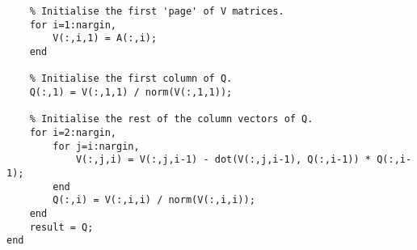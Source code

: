 \documentclass{article}
\begin{document}
\begin{enumerate}
\begin{enumerate}
\begin{verbatim}
    % Initialise the first 'page' of V matrices.
    for i=1:nargin,
        V(:,i,1) = A(:,i);
    end
    
    % Initialise the first column of Q.
    Q(:,1) = V(:,1,1) / norm(V(:,1,1));
    
    % Initialise the rest of the column vectors of Q.
    for i=2:nargin,
        for j=i:nargin,
            V(:,j,i) = V(:,j,i-1) - dot(V(:,j,i-1), Q(:,i-1)) * Q(:,i-1);
        end
        Q(:,i) = V(:,i,i) / norm(V(:,i,i));
    end    
    result = Q;
end

		\end{verbatim}
	\end{enumerate}
\end{enumerate}
\end{document}
